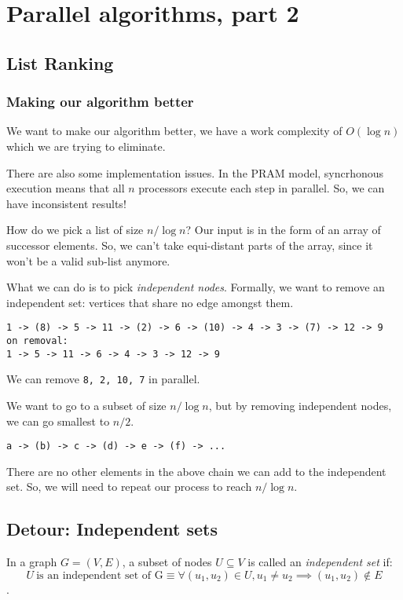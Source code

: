 \chapter{Parallel algorithms, part 2}

\section{List Ranking}

\subsection{Making our algorithm better}
We want to make our algorithm better, we have a work complexity of $O(\log n)$
which we are trying to eliminate.

There are also some implementation issues. In the PRAM model, syncrhonous execution
means that all $n$ processors execute each step in parallel. So, we can have
inconsistent results!

How do we pick a list of size $n / \log n$? Our input is in the form of an array
of successor elements. So, we can't take equi-distant parts of the array,
since it won't be a valid sub-list anymore.


What we can do is to pick \textit{independent nodes}. Formally, we want
to remove an independent set: vertices that share no edge amongst them.

\begin{verbatim}
1 -> (8) -> 5 -> 11 -> (2) -> 6 -> (10) -> 4 -> 3 -> (7) -> 12 -> 9
on removal:
1 -> 5 -> 11 -> 6 -> 4 -> 3 -> 12 -> 9
\end{verbatim}
We can remove \texttt{8, 2, 10, 7} in parallel.

We want to go to a subset of size $n / \log n$, but by removing independent
nodes, we can go smallest to $n / 2$.

\begin{verbatim}
a -> (b) -> c -> (d) -> e -> (f) -> ...
\end{verbatim}
There are no other elements in the above chain we can add to the independent set.
So, we will need to repeat our process to reach $n / \log n$.

\section{Detour: Independent sets}
In a graph $G = (V, E)$, a subset of nodes $U \subseteq V$ is called an
\textit{independent set} if:
$$U~\text{is an independent set of G} \equiv \forall (u_1, u_2) \in U, u_1 \neq u_2 \implies (u_1, u_2) \notin E$$.

